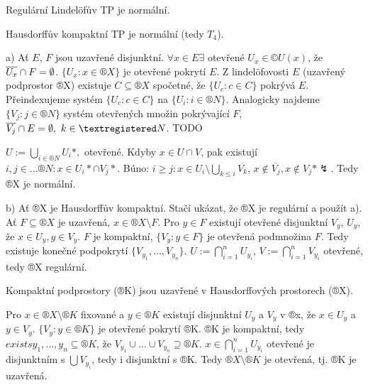 \documentclass[12pt]{article}					%
\begin{document}
    \begin{veta}
        Regulární Lindelöfův TP je normální.

        Hausdorffův kompaktní TP je normální (tedy $T_4$).

        \begin{dukazin}
                a) Ať $E$, $F$ jsou uzavřené disjunktní. $\forall x \in E \exists$ otevřené $U_x \in ©U(x)$, že $\overline{U_x} \cap F = \emptyset$. $\{U_x: x\in ®X\}$ je otevřené pokrytí $E$. Z lindelöfovosti $E$ (uzavřený podprostor ®X) existuje $C \subseteq ®X$ spočetné, že $\{U_c: c \in C\}$ pokrývá $E$. Přeindexujeme systém $\{U_c: c \in C\}$ na $\{U_i: i \in ®N\}$. Analogicky najdeme $\{V_j: j \in ®N\}$ systém otevřených množin pokrývající $F$, $\overline{V_j} \cap E = \O,\ k \in ®N$. TODO

                $U := \bigcup_{i \in ®N} U_i*, $ otevřené. Kdyby $x \in U \cap V$, pak existují $i, j \in …®N: x \in U_i*\cap V_j*$. Búno: $i ≥ j: x \in U_i \setminus \bigcup_{k ≤ i} \overline{V_k}$, $x \notin \overline{V_j}, x \notin V_j* \lightning$. Tedy ®X je normální.

                b) Ať ®X je Hausdorffův kompaktní. Stačí ukázat, že ®X je regulární a použít a). Ať $F \subseteq ®X$ je uzavřená, $x \in ®X \setminus F$. Pro $y \in F$ existují otevřené disjunktní $V_y$, $U_y$, že $x \in U_y, y \in V_y$. $F$ je kompaktní, $\{V_y : y \in F\}$ je otevřená podmnožina $F$. Tedy existuje konečné podpokrytí $\{V_{y_1}, …, V_{y_n}\}$. $U := \bigcap_{i = 1}^n U_{y_i}$, $V := \bigcap_{i = 1}^n V_{y_i}$ otevřené, tedy ®X regulární.
        \end{dukazin}
    \end{veta}


    \begin{tvrzeni}
            Kompaktní podprostory (®K) jsou uzavřené v Hausdorffových prostorech (®X).
        \begin{dukazin}
                Pro $x \in ®X \setminus ®K$ fixované a $y \in ®K$ existují disjunktní $U_y$ a $V_y$ v ®x, že $x \in U_y$ a $y \in V_y$. $\{V_y: y \in ®K\}$ je otevřené pokrytí ®K. ®K je kompaktní, tedy $exists y_1, …, y_n \subseteq ®K$, že $V_{y_1} \cup … \cup V_{y_n} \supseteq ®K$. $x \in \bigcap_{i=1}^n U_{y_i}$ otevřené je disjunktním s $\bigcup V_{y_i}$, tedy i disjunktní s ®K. Tedy $®X \setminus ®K$ je otevřená, tj. ®K je uzavřená.
        \end{dukazin}
    \end{tvrzeni}
\end{document}
